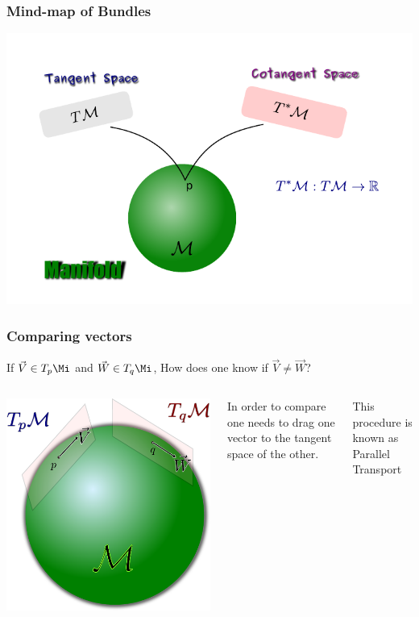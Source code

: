 \begin{frame}
  \frametitle{Mind-map of Bundles}
  \begin{center}
    \includegraphics[scale=.9]{Pictures/Tan-Cotan.pdf}
  \end{center}
\end{frame}

\begin{frame}
  \frametitle{Comparing vectors}
  If  $\vec{V}\in T_p\Mi$ and $\vec{W}\in T_q\Mi$, How does one know if $\vec{V}\neq \vec{W}$?

  \begin{columns}
    \begin{center}
      \includegraphics[scale=.35]{Pictures/Compare.pdf}
    \end{center}
    In order to compare one needs to drag one vector to the tangent space of the other.

    This procedure is known as \alert{Parallel Transport}
  \end{columns}
\end{frame}

